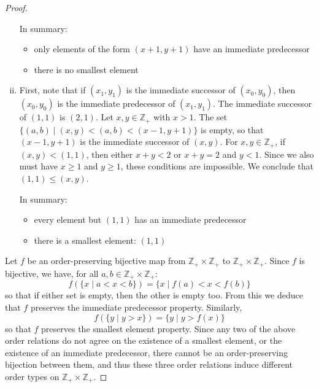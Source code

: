 \documentclass[11pt,a4paper,twoside]{article}
\theoremstyle{definition}
\begin{document}
\begin{proof}
\begin{enumerate}[(i)]
    In summary:
    \begin{itemize}
    \item only elements of the form $(x + 1, y + 1)$ have an immediate predecessor
    \item there is no smallest element
    \end{itemize}

  \item First, note that if $(x_1, y_1)$ is the immediate successor of $(x_0, y_0)$, then $(x_0, y_0)$ is the immediate predecessor of $(x_1, y_1)$.
    The immediate successor of $(1, 1)$ is $(2, 1)$. Let $x, y \in \mathbb{Z}_+$ with $x > 1$. The set $\{ (a, b) \mid (x, y) < (a, b) < (x - 1, y + 1) \}$ is empty, so that
    $(x - 1, y + 1)$ is the immediate successor of $(x, y)$. For $x, y \in \mathbb{Z}_+$, if $(x, y) < (1, 1)$, then either $x + y < 2$ or $x + y = 2$ and $y < 1$.
    Since we also must have $x \geq 1$ and $y \geq 1$, these conditions are impossible. We conclude that $(1, 1) \leq (x, y)$.

    In summary:
    \begin{itemize}
    \item every element but $(1, 1)$ has an immediate predecessor
    \item there is a smallest element: $(1, 1)$
    \end{itemize}

  \end{enumerate}

  Let $f$ be an order-preserving bijective map from $\mathbb{Z}_+ \times \mathbb{Z}_+$ to $\mathbb{Z}_+ \times \mathbb{Z}_+$.
  Since $f$ is bijective, we have, for all $a, b \in \mathbb{Z}_+ \times \mathbb{Z}_+$:
  \begin{equation*}
    f \left( \{ x \mid a < x < b \} \right) = \{ x \mid f(a) < x < f(b) \}
  \end{equation*}
  so that if either set is empty, then the other is empty too. From this we deduce that $f$ preserves the immediate predecessor property.
  Similarly,
  \begin{equation*}
    f \left( \{ y \mid y > x \} \right) = \{ y \mid y > f (x)\}
  \end{equation*}
  so that $f$ preserves the smallest element property.
  Since any two of the above order relations do not agree on the existence of a smallest element, or the existence of an immediate predecessor,
  there cannot be an order-preserving bijection between them, and thus these three order relations induce different order types on $\mathbb{Z}_+ \times \mathbb{Z}_+$.

\end{proof}
\end{document}
